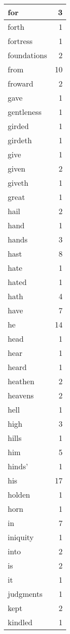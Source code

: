 \begin{center}
\begin{longtable}{l|r}
for & 3 \\ \hline
forth & 1 \\ \hline
fortress & 1 \\ \hline
foundations & 2 \\ \hline
from & 10 \\ \hline
froward & 2 \\ \hline
gave & 1 \\ \hline
gentleness & 1 \\ \hline
girded & 1 \\ \hline
girdeth & 1 \\ \hline
give & 1 \\ \hline
given & 2 \\ \hline
giveth & 1 \\ \hline
great & 1 \\ \hline
hail & 2 \\ \hline
hand & 1 \\ \hline
hands & 3 \\ \hline
hast & 8 \\ \hline
hate & 1 \\ \hline
hated & 1 \\ \hline
hath & 4 \\ \hline
have & 7 \\ \hline
he & 14 \\ \hline
head & 1 \\ \hline
hear & 1 \\ \hline
heard & 1 \\ \hline
heathen & 2 \\ \hline
heavens & 2 \\ \hline
hell & 1 \\ \hline
high & 3 \\ \hline
hills & 1 \\ \hline
him & 5 \\ \hline
hinds' & 1 \\ \hline
his & 17 \\ \hline
holden & 1 \\ \hline
horn & 1 \\ \hline
in & 7 \\ \hline
iniquity & 1 \\ \hline
into & 2 \\ \hline
is & 2 \\ \hline
it & 1 \\ \hline
judgments & 1 \\ \hline
kept & 2 \\ \hline
kindled & 1 \\ \hline

\end{longtable}
\end{center}
